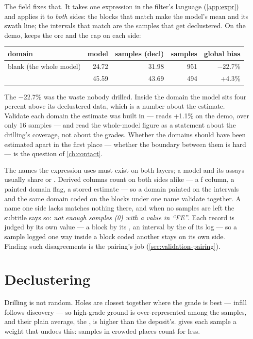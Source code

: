 The  field fixes that. It takes one expression in the filter's language (\cref{app:expr}) and applies it to \emph{both} sides: the blocks that match make the model's mean and its swath line; the intervals that match are the samples that get declustered. On the demo,  keeps the ore and the cap on each side:

\medskip
\begin{tabularx}{\linewidth}{@{}Lrrrr@{}}\toprule
domain & model & samples (decl) & samples & global bias \\ \midrule
blank (the whole model) & 24.72 & 31.98 & 951 & −22.7\% \\
 & 45.59 & 43.69 & 494 & +4.3\% \\ \bottomrule
\end{tabularx}
\medskip

The −22.7\% was the waste nobody drilled. Inside the domain the model sits four percent above its declustered data, which is a number about the estimate. Validate each domain the estimate was built in —  reads +1.1\% on the demo, over only 16 samples — and read the whole-model figure as a statement about the drilling's coverage, not about the grades. Whether the domains should have been estimated apart in the first place — whether the boundary between them is hard — is the question of \cref{ch:contact}.

The names the expression uses must exist on both layers; a model and its assays usually share  or . Derived columns count on both sides alike — a ƒ column, a painted domain flag, a stored estimate — so a domain painted on the intervals and the same domain coded on the blocks under one name validate together. A name one side lacks matches nothing there, and when no samples are left the subtitle says so: \emph{not enough samples (0) with a value in “FE”}. Each record is judged by its own value — a block by its , an interval by the  of its log — so a sample logged one way inside a block coded another stays on its own side. Finding such disagreements is the pairing's job (\cref{sec:validation-pairing}).

\section{Declustering}\label{sec:validation-decluster}
Drilling is not random. Holes are closest together where the grade is best — infill follows discovery — so high-grade ground is over-represented among the samples, and their plain average, the , is higher than the deposit's.  gives each sample a weight that undoes this: samples in crowded places count for less.

